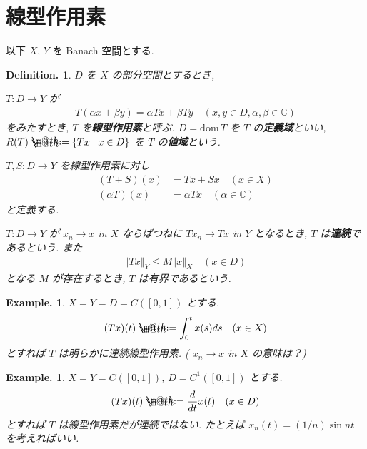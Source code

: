 \documentclass[openany, a4paper, oneside]{jsbook}
\makeatletter
\newcommand*{\defeq}{\mathrel{\rlap{%
\raisebox{0.3ex}{$\m@th\cdot$}}%
\raisebox{-0.3ex}{$\m@th\cdot$}}%
=}
\newcommand{\dom}{\mathrm{dom}\,}
\theoremstyle{break}
\theoremstyle{breakdefn}
\newtheorem{defn}[thm]{Definition.}
\newtheorem{ex}[thm]{Example.}
\newcommand{\norm}[1]{\left\Vert#1\right\Vert}
\newcommand{\relmiddle}[1]{\mathrel{}\middle#1\mathrel{}}
\newcommand{\set}[2]{\left\{#1 \relmiddle| #2\right\}}
\newcommand{\bbC}{\mathbb{C}}
\makeatother
\begin{document}
\section{線型作用素}


以下 $X$, $Y$ を Banach 空間とする.
\begin{defn}
$D$ を $X$ の部分空間とするとき,

$T \colon D \to Y$ が
\begin{align}
 T (\alpha x + \beta y)
 =
 \alpha Tx + \beta Ty
 \quad (x, y \in D, \alpha, \beta \in \bbC)
\end{align}
をみたすとき, $T$ を\textbf{線型作用素}と呼ぶ.
$D = \dom T$ を $T$ の\textbf{定義域}といい,
$R(T) \defeq \set{Tx}{x \in D}$ を $T$ の\textbf{値域}という.

$T, S \colon D \to Y$ を線型作用素に対し
\begin{align}
 (T + S)(x)
 &=
 Tx + Sx \quad (x \in X) \\
 (\alpha T)(x)
 &= \alpha Tx \quad (\alpha \in \bbC)
\end{align}
と定義する.

$T \colon D \to Y$ が
$x_n \to x$ in $X$ ならばつねに $Tx_n \to Tx$  in  $Y$
となるとき, $T$ は\textbf{連続}であるという.
また
\begin{align}
 \norm{Tx}_Y
 \leq
 M \norm{x}_X \quad (x \in D)
\end{align}
となる $M$ が存在するとき, $T$ は有界であるという.
\end{defn}

\begin{ex}
$X=Y=D=C([0, 1])$ とする.
\begin{align}
 (Tx)(t)
 \defeq
 \int_0^t x(s)ds \quad (x \in X)
\end{align}
とすれば $T$ は明らかに連続線型作用素.
( $x_n \to x$  in  $X$  の意味は？)
\end{ex}
\begin{ex}
$X=Y=C([0, 1])$, $D = C^1([0, 1])$ とする.
\begin{align}
 (Tx)(t)
 \defeq
 \frac{d}{dt}x(t) \quad (x \in D)
\end{align}
とすれば $T$ は線型作用素だが連続ではない.
たとえば $x_n(t) = (1/n) \sin nt$ を考えればいい.
\end{ex}
\end{document}
